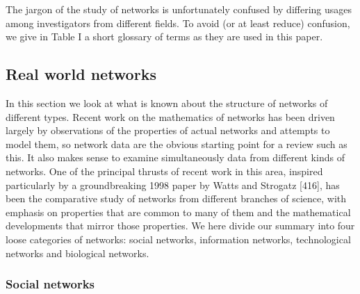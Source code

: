     The jargon of the study of networks is unfortunately confused by differing usages among investigators from different fields. To avoid (or at least reduce) confusion, we give in Table I a short glossary of terms as they are used in this paper.
    
  \subsection{Real world networks}
  
    In this section we look at what is known about the structure of networks of different types. Recent work on the mathematics of networks has been driven largely by observations of the properties of actual networks and attempts to model them, so network data are the obvious starting point for a review such as this. It also makes sense to examine simultaneously data from different kinds of networks. One of the principal thrusts of recent work in this area, inspired particularly by a groundbreaking 1998 paper by Watts and Strogatz [416], has been the comparative study of networks from different branches of science, with emphasis on properties that are common to many of them and the mathematical developments that mirror those properties. We here divide our summary into four loose categories of networks: social networks, information networks, technological networks and biological networks.
    
    \subsubsection{Social networks}
    

